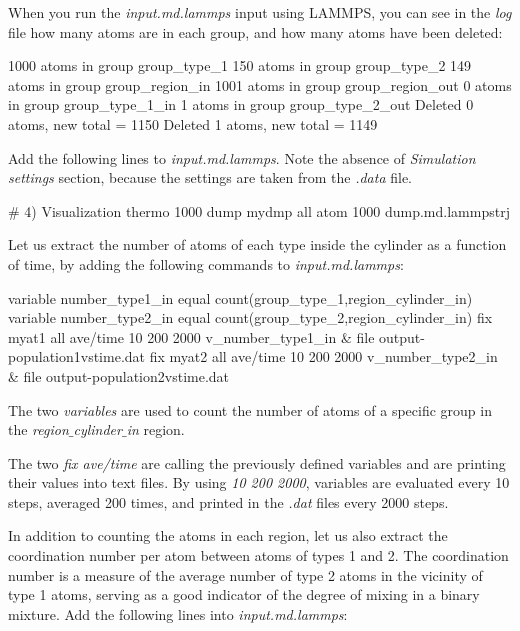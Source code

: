 \vspace{0.25cm} \noindent When you run the \textit{input.md.lammps} input using LAMMPS, you
can see in the \textit{log} file how many atoms are in each group,
and how many atoms have been deleted:

\begin{lcverbatim}
1000 atoms in group group_type_1
150 atoms in group group_type_2
149 atoms in group group_region_in
1001 atoms in group group_region_out
0 atoms in group group_type_1_in
1 atoms in group group_type_2_out
Deleted 0 atoms, new total = 1150
Deleted 1 atoms, new total = 1149
\end{lcverbatim}

\noindent Add the following lines to \textit{input.md.lammps}.
Note the absence of \textit{Simulation settings} section,
because the settings are taken from the \textit{.data} file.

\begin{lcverbatim}
# 4) Visualization
thermo 1000
dump mydmp all atom 1000 dump.md.lammpstrj
\end{lcverbatim}

\noindent Let us extract the number of atoms of each type
inside the cylinder as a function of time, by
adding the following commands to \textit{input.md.lammps}:

\begin{lcverbatim}
variable number_type1_in equal count(group_type_1,region_cylinder_in)
variable number_type2_in equal count(group_type_2,region_cylinder_in)
fix myat1 all ave/time 10 200 2000 v_number_type1_in &
    file output-population1vstime.dat
fix myat2 all ave/time 10 200 2000 v_number_type2_in &
    file output-population2vstime.dat
\end{lcverbatim}

\noindent The two \textit{variables} are used to count
the number of atoms of a specific group in the \textit{region$\_$cylinder$\_$in} region. 

\vspace{0.25cm} \noindent The two \textit{fix ave/time}
are calling the previously defined variables and are printing
their values into text files.
By using \textit{10 200 2000}, variables are evaluated every 10 steps, 
averaged 200 times, and printed in the \textit{.dat} files every 2000 steps.

\vspace{0.25cm} \noindent In addition to counting the atoms in each region, let us also extract the
coordination number per atom between atoms of types 1 and 2. The
coordination number is a measure of the average number of type 2 atoms
in the vicinity of type 1 atoms, serving as a good indicator of
the degree of mixing in a binary mixture. Add the following lines into
\textit{input.md.lammps}:

